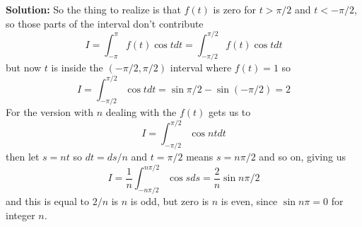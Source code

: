 \documentclass[12pt]{article}
\begin{document}
\textbf{Solution: } So the thing to realize is that $f(t)$ is zero for $t>\pi/2$ and $t<-\pi/2$, so those parts of the interval don't contribute
\begin{equation}
I=\int_{-\pi}^\pi f(t)\cos{t}dt=\int_{-\pi/2}^{\pi/2} f(t)\cos{t}dt
\end{equation}
but now $t$ is inside the $(-\pi/2,\pi/2)$ interval where $f(t)=1$ so
\begin{equation}
I=\int_{-\pi/2}^{\pi/2} \cos{t}dt=\sin{\pi/2}-\sin{(-\pi/2)}=2
\end{equation}
For the version with $n$ dealing with the $f(t)$ gets us to
\begin{equation}
I=\int_{-\pi/2}^{\pi/2} \cos{nt}dt
\end{equation}
then let $s=nt$ so $dt=ds/n$ and $t=\pi/2$ means $s=n\pi/2$ and so on, giving us
\begin{equation}
I=\frac{1}{n}\int_{-n\pi/2}^{n\pi/2} \cos{s}ds=\frac{2}{n}\sin{n\pi/2}
\end{equation}
and this is equal to $2/n$ is $n$ is odd, but zero is $n$ is even, since $\sin{n\pi}=0$ for integer $n$.
\end{document}
